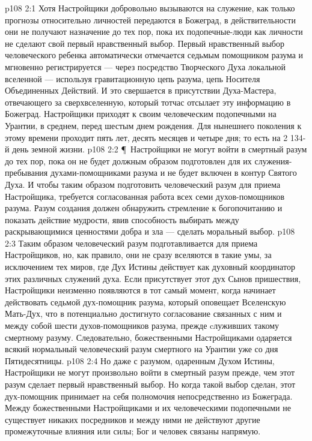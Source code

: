 \vs p108 2:1 Хотя Настройщики добровольно вызываются на служение, как только прогнозы относительно личностей передаются в Божеград, в действительности они не получают назначение до тех пор, пока их подопечные\hyp{}люди как личности не сделают свой первый нравственный выбор. Первый нравственный выбор человеческого ребенка автоматически отмечается седьмым помощником разума и мгновенно регистрируется --- через посредство Творческого Духа локальной вселенной --- используя гравитационную цепь разума, цепь Носителя Объединенных Действий. И это свершается в присутствии Духа\hyp{}Мастера, отвечающего за сверхвселенную, который тотчас отсылает эту информацию в Божеград. Настройщики приходят к своим человеческим подопечными на Урантии, в среднем, перед шестым днем рождения. Для нынешнего поколения к этому времени проходит пять лет, десять месяцев и четыре дня; то есть на 2 134\hyp{}й день земной жизни.
\vs p108 2:2 \P\ Настройщики не могут войти в смертный разум до тех пор, пока он не будет должным образом подготовлен для их служения\hyp{}пребывания духами\hyp{}помощниками разума и не будет включен в контур Святого Духа. И чтобы таким образом подготовить человеческий разум для приема Настройщика, требуется согласованная работа всех семи духов\hyp{}помощников разума. Разум создания должен обнаружить стремление к богопочитанию и показать действие мудрости, явив способность выбирать между раскрывающимися ценностями добра и зла --- сделать моральный выбор.
\vs p108 2:3 Таким образом человеческий разум подготавливается для приема Настройщиков, но, как правило, они не сразу вселяются в такие умы, за исключением тех миров, где Дух Истины действует как духовный координатор этих различных служений духа. Если присутствует этот дух Сынов пришествия, Настройщики неизменно появляются в тот самый момент, когда начинает действовать седьмой дух\hyp{}помощник разума, который оповещает Вселенскую Мать\hyp{}Дух, что в потенциально достигнуто согласование связанных с ним и между собой шести духов\hyp{}помощников разума, прежде cлуживших такому смертному разуму. Следовательно, божественными Настройщиками одаряется всякий нормальный человеческий разум смертного на Урантии уже со дня Пятидесятницы.
\vs p108 2:4 Но даже с разумом, одаренным Духом Истины, Настройщики не могут произвольно войти в смертный разум прежде, чем этот разум сделает первый нравственный выбор. Но когда такой выбор сделан, этот дух\hyp{}помощник принимает на себя полномочия непосредственно из Божеграда. Между божественными Настройщиками и их человеческими подопечными не существует никаких посредников и между ними не действуют другие промежуточные влияния или силы; Бог и человек связаны напрямую.
